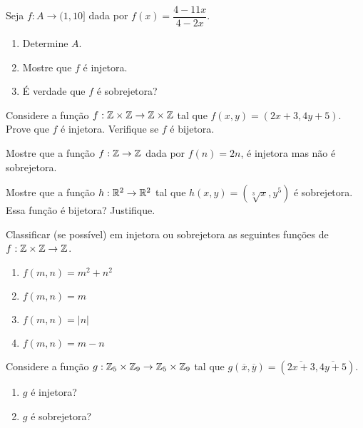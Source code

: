 \documentclass[12pt]{exam}
\begin{document}
\vspace{.3cm}

\questao{} Seja $f : A \to (1,10]$ dada por $f(x) = \dfrac{4 - 11x}{4 - 2x}$.
\begin{enumerate}[label={\alph*})]
    \item Determine $A$.

    \item Mostre que $f$ é injetora.

    \item É verdade que $f$ é sobrejetora?
\end{enumerate}

\vspace{.3cm}

\questao{} Considere a função $f : \mathbb{Z} \times \mathbb{Z} \to \mathbb{Z} \times \mathbb{Z}$ tal que $f(x,y) = (2x + 3, 4y + 5)$. Prove que $f$ é injetora. Verifique se $f$ é bijetora.

\vspace{.3cm}

\questao{} Mostre que a função $f : \mathbb{Z} \to \mathbb{Z}$ dada por $f(n) = 2n$, é injetora mas não é sobrejetora.

\vspace{.3cm}

\questao{} Mostre que a função $h : \mathbb{R}^2 \to \mathbb{R}^2$ tal que $h(x, y) = (\sqrt[3]{x}, y^5)$ é sobrejetora. Essa função é bijetora? Justifique.

\vspace{.3cm}

\questao{} Classificar (se possível) em injetora ou sobrejetora as seguintes funções de $f : \mathbb{Z} \times \mathbb{Z} \to \mathbb{Z}$.

\begin{multicols}{2}
    \begin{enumerate}[label={\alph*})]
        \item $f(m, n) = m^2 + n^2$

        \item $f(m, n) = m$

        \item $f(m, n) = |n|$

        \item $f(m, n) = m - n$
    \end{enumerate}
\end{multicols}

\vspace{.3cm}

\questao{} Considere a função $g : \mathbb{Z}_5 \times \mathbb{Z}_9 \to \mathbb{Z}_5 \times \mathbb{Z}_9$ tal que $g(\overline{x},\overline{y}) = (\overline{2x + 3}, \overline{4y + 5})$.
\begin{enumerate}[label={\alph*})]
    \item $g$ é injetora?

    \item $g$ é sobrejetora?
\end{enumerate}
\end{document}
